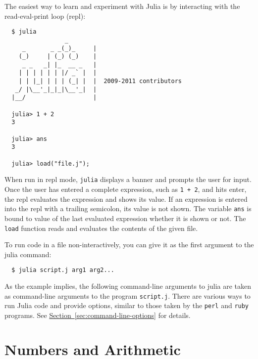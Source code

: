 \documentclass{article}
\renewcommand{\sec}[1]{\label{sec:#1}}
\newcommand{\Section}[1]{\hyperref[sec:#1]{Section~\ref*{sec:#1}}}
\begin{document}
The easiest way to learn and experiment with Julia is by interacting with the read-eval-print loop (repl):
\begin{verbatim}
  $ julia
                 _      
     _       _ _(_)_     |
    (_)     | (_) (_)    |  
     _ _   _| |_  __ _   |
    | | | | | | |/ _` |  |
    | | |_| | | | (_| |  |  2009-2011 contributors
   _/ |\__'_|_|_|\__'_|  |  
  |__/                   |

  julia> 1 + 2
  3

  julia> ans
  3

  julia> load("file.j");
\end{verbatim}
When run in repl mode, \verb|julia| displays a banner and prompts the user for input.
Once the user has entered a complete expression, such as \verb|1 + 2|, and hits enter, the repl evaluates the expression and shows its value.
If an expression is entered into the repl with a trailing semicolon, its value is not shown.
The variable \verb|ans| is bound to value of the last evaluated expression whether it is shown or not.
The \verb|load| function reads and evaluates the contents of the given file.

To run code in a file non-interactively, you can give it as the first argument to the julia command:
\begin{verbatim}
  $ julia script.j arg1 arg2...
\end{verbatim}
As the example implies, the following command-line arguments to julia are taken as command-line arguments to the program \verb|script.j|.
There are various ways to run Julia code and provide options, similar to those taken by the \verb|perl| and \verb|ruby| programs.
See \Section{command-line-options} for details.

\section{Numbers and Arithmetic}\sec{numbers-and-arithmetic}
\end{document}
